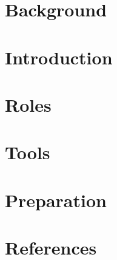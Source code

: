 \section[Back]{Background}


\section[Intro]{Introduction}


\section[Roles]{Roles}


\section[Tools]{Tools}



\section[Prep]{Preparation}



\section[Refs]{References}
